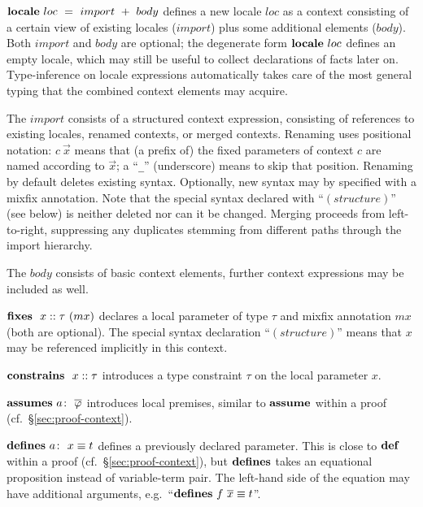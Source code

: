\begin{descr}
  
\item [${\mathord{\mathbf{locale}}}~loc~=~import~+~body$] defines a new locale $loc$ as a context
  consisting of a certain view of existing locales ($import$) plus some
  additional elements ($body$).  Both $import$ and $body$ are optional; the
  degenerate form ${\mathord{\mathbf{locale}}}~loc$ defines an empty locale, which may still be
  useful to collect declarations of facts later on.  Type-inference on locale
  expressions automatically takes care of the most general typing that the
  combined context elements may acquire.

  The $import$ consists of a structured context expression, consisting of
  references to existing locales, renamed contexts, or merged contexts.
  Renaming uses positional notation: $c~\vec x$ means that (a prefix of) the
  fixed parameters of context $c$ are named according to $\vec x$; a
  ``\texttt{_}'' (underscore)  means to skip that
  position.  Renaming by default deletes existing syntax.  Optionally,
  new syntax may by specified with a mixfix annotation.  Note that the
  special syntax declared with ``$(structure)$'' (see below) is
  neither deleted nor can it be changed.
  Merging proceeds from left-to-right, suppressing any duplicates stemming
  from different paths through the import hierarchy.

  The $body$ consists of basic context elements, further context expressions
  may be included as well.

  \begin{descr}

  \item [${\mathord{\mathbf{fixes}}}~~x::\tau~(mx)$] declares a local parameter of type $\tau$
    and mixfix annotation $mx$ (both are optional).  The special syntax
    declaration ``$(structure)$'' means that $x$ may be referenced
    implicitly in this context.

  \item [${\mathord{\mathbf{constrains}}}~~x::\tau$] introduces a type constraint $\tau$
    on the local parameter $x$.

  \item [$\ASSUMES{a}{\vec\phi}$] introduces local premises, similar to
    ${\mathord{\mathbf{assume}}}$ within a proof (cf.\ \S\ref{sec:proof-context}).

  \item [$\DEFINES{a}{x \equiv t}$] defines a previously declared parameter.
    This is close to ${\mathord{\mathbf{def}}}$ within a proof (cf.\
    \S\ref{sec:proof-context}), but ${\mathord{\mathbf{defines}}}$ takes an equational
    proposition instead of variable-term pair.  The left-hand side of the
    equation may have additional arguments, e.g.\ ``$\DEFINES{}{f~\vec x
      \equiv t}$''.


\end{descr}
\end{descr}
